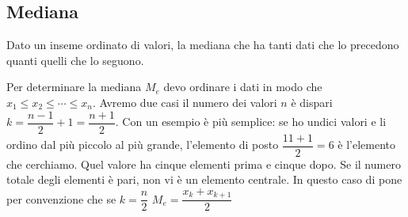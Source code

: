 \subsection{Mediana}
\begin{definizione}[Mediana]
Dato un inseme ordinato di valori, la mediana che ha tanti dati che lo precedono quanti quelli che lo seguono.
\end{definizione}
Per determinare la mediana $M_e$ devo ordinare i dati in modo che $x_1\leq x_2\leq\cdots\leq x_n $. Avremo due casi il numero dei valori $n$ è dispari $k=\dfrac{n-1}{2}+1=\dfrac{n+1}{2}$. Con un esempio è più semplice: se ho undici valori e li ordino dal più piccolo al più grande, l'elemento di posto $ \dfrac{11+1}{2}=6$ è l'elemento che cerchiamo. Quel valore ha cinque elementi prima e cinque dopo. Se il numero totale  degli elementi è pari, non vi è un elemento centrale. In questo caso di pone per convenzione che se $k=\dfrac{n}{2}$ $M_e=\dfrac{x_k+x_{k+1}}{2}$